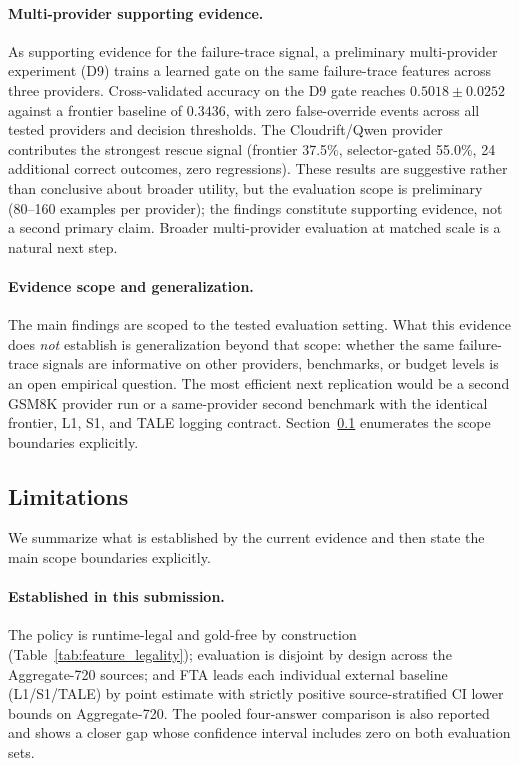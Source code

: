 \documentclass[smallcondensed]{svjour3}
\begin{document}
\paragraph{Multi-provider supporting evidence.}
As supporting evidence for the failure-trace signal,
a preliminary multi-provider experiment (D9) trains a learned gate on the same
failure-trace features across three providers.
Cross-validated accuracy on the D9 gate reaches $0.5018 \pm 0.0252$ against a
frontier baseline of $0.3436$, with zero false-override events across all tested
providers and decision thresholds.
The Cloudrift/Qwen provider contributes the strongest rescue signal
(frontier 37.5\%, selector-gated 55.0\%, 24 additional correct outcomes, zero regressions).
These results are suggestive rather than conclusive about broader utility, but
the evaluation scope is preliminary (80--160 examples per provider); the
findings constitute supporting evidence, not a second primary claim.
Broader multi-provider evaluation at matched scale is a natural next step.

\paragraph{Evidence scope and generalization.}
The main findings are scoped to the tested evaluation setting.
What this evidence does \emph{not} establish is generalization beyond that
scope: whether the same failure-trace signals are informative on other
providers, benchmarks, or budget levels is an open empirical question.
The most efficient next replication would be a second GSM8K provider run or a
same-provider second benchmark with the identical frontier, L1, S1, and TALE
logging contract.
Section~\ref{sec:limitations} enumerates the scope boundaries explicitly.

\subsection{Limitations}
\label{sec:limitations}

We summarize what is established by the current evidence and then state the
main scope boundaries explicitly.

\paragraph{Established in this submission.}
The policy is runtime-legal and gold-free by construction
(Table~\ref{tab:feature_legality}); evaluation is disjoint by design across
the Aggregate-720 sources; and FTA leads each individual external baseline
(L1/S1/TALE) by point estimate with strictly positive source-stratified CI
lower bounds on Aggregate-720.
The pooled four-answer comparison is also reported and shows a closer gap
whose confidence interval includes zero on both evaluation sets.
\end{document}
